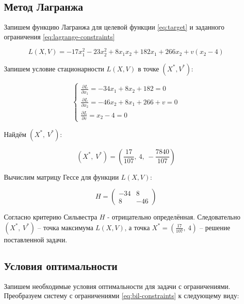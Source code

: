 \subsection{Метод Лагранжа}

Запишем функцию Лагранжа для целевой функции \ref{eq:target} и заданного ограничения \ref{eq:lagrange-constraints}

\begin{equation*}
	L(X, V) = -17 x^2_1 - 23 x^2_2 + 8 x_1 x_2 + 182 x_1 + 266 x_2 + v(x_2 - 4)
\end{equation*}

Запишем условие стационарности $L(X, V)$ в точке $(X^*, V^*)$:

\begin{equation*}
	\begin{cases}
		\frac{\partial L}{\partial x_1} = -34 x_1 + 8 x_2 + 182 = 0
		\\
		\frac{\partial L}{\partial x_2} = -46 x_2 + 8 x_1 + 266 + v = 0
		\\
		\frac{\partial L}{\partial v} = x_2 - 4 = 0
	\end{cases}
\end{equation*}

Найдём $(X^*,\ V^*)$:

\begin{equation*}
	(X^*,\ V^*) = \left( \frac{17}{107},\ 4,\ -\frac{7840}{107} \right)
\end{equation*}

Вычислим матрицу Гессе для функции $L(X, V)$:

\begin{equation*}
	H = \begin{pmatrix}
		-34 & 8
		\\
		8 & -46
	\end{pmatrix}
\end{equation*}

Согласно критерию Сильвестра $H$ - отрицательно определённая. Следовательно $(X^*,\ V^*)$ -- точка максимума $L(X, V)$, а точка $X^* = \left(\frac{17}{107},\ 4 \right)$ -- решение поставленной задачи.

\subsection{Условия оптимальности}

Запишем необходимые условия оптимальности для задачи с ограничениями. Преобразуем систему с ограничениями \ref{eq:bil-constraints} к следующему виду:

